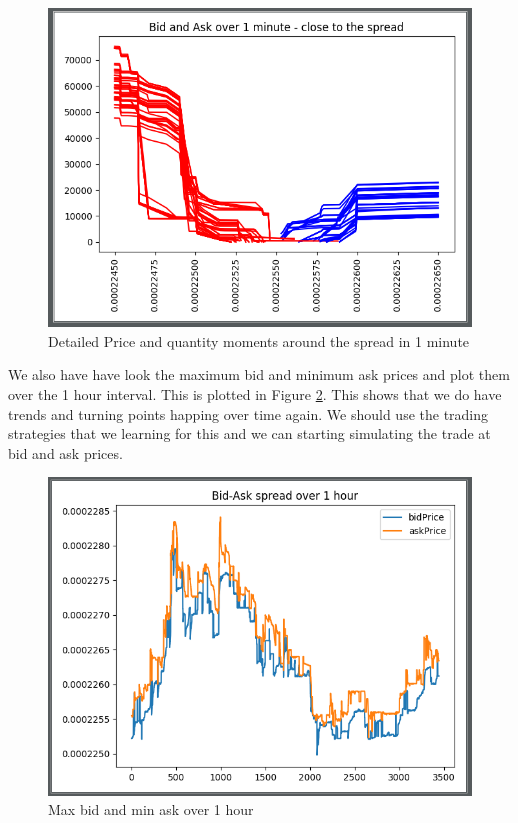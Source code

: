 \documentclass[12pt]{article}
\begin{document}
\begin{figure}[h!]
	\centering
  \includegraphics[scale=0.5]{plot2.png}
  \caption{Detailed Price and quantity moments around the spread in 1 minute}
  \label{fig:plt2}
\end{figure}

We also have have look the maximum bid and minimum ask prices and plot them over the 1 hour interval. This is plotted in Figure \ref{fig:plt3}. This shows that we do have trends and turning points happing over time again. We should use the trading strategies that we learning for this and we can starting simulating the trade at bid and ask prices.

\begin{figure}[h!]
	\centering
  \includegraphics[scale=0.5]{plot3.png}
  \caption{Max bid and min ask over 1 hour}
  \label{fig:plt3}
\end{figure}
\end{document}
